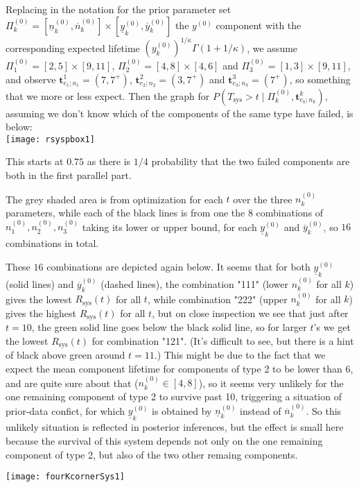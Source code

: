 \documentclass[12pt,a4paper,fleqn]{narms}
\newcommand{\mbf}[1]{\mathbf{#1}}
\newcommand{\uz}{^{(0)}} %
\newcommand{\ul}[1]{\underline{#1}}
\newcommand{\ol}[1]{\overline{#1}}
\newcommand{\Rsys}{R_\text{sys}}
\def\Tsys{T_\text{sys}}
\def\yz{y\uz}
\def\ykz{y\uz_k}
\def\ykzl{\ul{y}\uz_k}
\def\ykzu{\ol{y}\uz_k}
\def\nkz{n\uz_k}
\newcommand{\nkzfun}[1]{n\uz_{#1}}
\def\nkzl{\ul{n}\uz_k}
\def\nkzu{\ol{n}\uz_k}
\def\PkZ{\Pi\uz_k}
\newcommand{\PZi}[1]{\Pi\uz_{#1}}
\begin{document}
\bigskip

Replacing in the notation for the prior parameter set $\PkZ = [\nkzl,\nkzu] \times [\ykzl,\ykzu]$
the $\yz$ component with the corresponding expected lifetime $(\ykz)^{1/\kappa} \Gamma(1 + 1/\kappa)$,
we assume $\PZi{1} = [2,5] \times [9, 11]$, $\PZi{2} = [4,8] \times [4, 6]$ and $\PZi{3} = [1,3] \times [9, 11]$,
and observe $\mbf{t}^1_{e_1;n_1} = (7, 7^+)$, $\mbf{t}^2_{e_2;n_2} = (3,7^+)$ and $\mbf{t}^3_{e_3;n_3} = (7^+)$,
so something that we more or less expect. Then the graph for $P(\Tsys > t\mid\PkZ, \mbf{t}^k_{e_k;n_k})$,
assuming we don't know which of the components of the same type have failed, is below:\\

\texttt{[image: rsyspbox1]}

This starts at $0.75$ as there is $1/4$ probability that the two failed components
are both in the first parallel part.

The grey shaded area is from optimization for each $t$ over the three $\nkz$ parameters,
while each of the black lines is from one the $8$ combinations of $\nkzfun{1}, \nkzfun{2}, \nkzfun{3}$
taking its lower or upper bound, for each $\ykzl$ and $\ykzu$, so $16$ combinations in total.

These $16$ combinations are depicted again below. It seems that for both $\ykzl$ (solid lines) and $\ykzu$ (dashed lines),
the combination "111" (lower $\nkz$ for all $k$) gives the lowest $\Rsys(t)$ for all $t$,
while combination "222" (upper $\nkz$ for all $k$) gives the highest $\Rsys(t)$ for all $t$,
but on close inspection we see that just after $t=10$, the green solid line goes below the
black solid line, so for larger $t$'s we get the lowest $\Rsys(t)$ for combination "121".
(It's difficult to see, but there is a hint of black above green around $t=11$.)
This might be due to the fact that we expect the mean component lifetime for components of type 2 to be lower than 6,
and are quite sure about that ($\nkz \in [4,8]$), so it seems very unlikely for the one remaining component of type 2
to survive past 10, triggering a situation of prior-data confict,
for which $\ykzl$ is obtained by $\nkzl$ instead of $\nkzu$.
So this unlikely situation is reflected in posterior inferences,
but the effect is small here because the survival of this system depends not only on the one remaining component of type 2,
but also of the two other remaing components.

\texttt{[image: fourKcornerSys1]}
\end{document}
